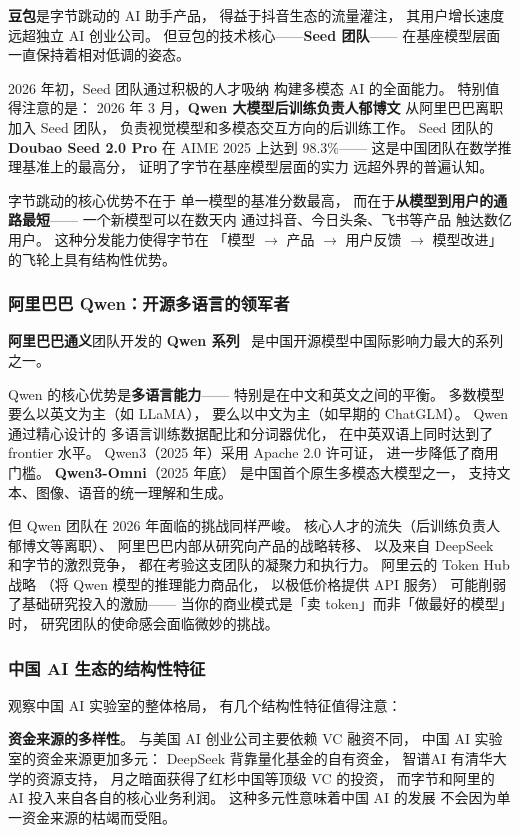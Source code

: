 \textbf{豆包}是字节跳动的 AI 助手产品，
得益于抖音生态的流量灌注，
其用户增长速度远超独立 AI 创业公司。
但豆包的技术核心——\textbf{Seed 团队}——
在基座模型层面一直保持着相对低调的姿态。

2026 年初，Seed 团队通过积极的人才吸纳
构建多模态 AI 的全面能力。
特别值得注意的是：
2026 年 3 月，\textbf{Qwen 大模型后训练负责人郁博文}
从阿里巴巴离职加入 Seed 团队，
负责视觉模型和多模态交互方向的后训练工作。
Seed 团队的 \textbf{Doubao Seed 2.0 Pro}
在 AIME 2025 上达到 98.3\%——
这是中国团队在数学推理基准上的最高分，
证明了字节在基座模型层面的实力
远超外界的普遍认知。

字节跳动的核心优势不在于
单一模型的基准分数最高，
而在于\textbf{从模型到用户的通路最短}——
一个新模型可以在数天内
通过抖音、今日头条、飞书等产品
触达数亿用户。
这种分发能力使得字节在
「模型 $\to$ 产品 $\to$ 用户反馈 $\to$ 模型改进」
的飞轮上具有结构性优势。

\subsubsection{阿里巴巴 Qwen：开源多语言的领军者}

\textbf{阿里巴巴通义}团队开发的 \textbf{Qwen 系列}~\cite{qwen2025qwen3}
是中国开源模型中国际影响力最大的系列之一。

Qwen 的核心优势是\textbf{多语言能力}——
特别是在中文和英文之间的平衡。
多数模型要么以英文为主（如 LLaMA），
要么以中文为主（如早期的 ChatGLM）。
Qwen 通过精心设计的
多语言训练数据配比和分词器优化，
在中英双语上同时达到了 frontier 水平。
Qwen3（2025 年）采用 Apache 2.0 许可证，
进一步降低了商用门槛。
\textbf{Qwen3-Omni}（2025 年底）
是中国首个原生多模态大模型之一，
支持文本、图像、语音的统一理解和生成。

但 Qwen 团队在 2026 年面临的挑战同样严峻。
核心人才的流失（后训练负责人郁博文等离职）、
阿里巴巴内部从研究向产品的战略转移、
以及来自 DeepSeek 和字节的激烈竞争，
都在考验这支团队的凝聚力和执行力。
阿里云的 Token Hub 战略
（将 Qwen 模型的推理能力商品化，
以极低价格提供 API 服务）
可能削弱了基础研究投入的激励——
当你的商业模式是「卖 token」而非「做最好的模型」时，
研究团队的使命感会面临微妙的挑战。

\subsubsection{中国 AI 生态的结构性特征}

观察中国 AI 实验室的整体格局，
有几个结构性特征值得注意：

\textbf{资金来源的多样性}。
与美国 AI 创业公司主要依赖 VC 融资不同，
中国 AI 实验室的资金来源更加多元：
DeepSeek 背靠量化基金的自有资金，
智谱AI 有清华大学的资源支持，
月之暗面获得了红杉中国等顶级 VC 的投资，
而字节和阿里的 AI 投入来自各自的核心业务利润。
这种多元性意味着中国 AI 的发展
不会因为单一资金来源的枯竭而受阻。


